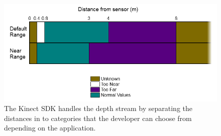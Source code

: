 \begin{figure}[t!]
\centering
\includegraphics[width=1\columnwidth]{Chapter3/3/depth_dist.png}
\caption[Depth stream distances.]{The Kinect SDK handles the depth stream by separating the distances in to categories that the developer can choose from depending on the application.}
\label{fig:depth-dist}
\end{figure}